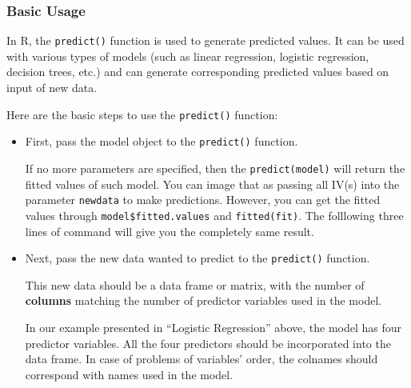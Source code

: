 \documentclass[
]{ctexart}
\newenvironment{Shaded}{\begin{snugshade}}{\end{snugshade}}
\newcommand{\FunctionTok}[1]{\textcolor[rgb]{0.13,0.29,0.53}{\textbf{#1}}}
\newcommand{\NormalTok}[1]{#1}
\newcommand{\SpecialCharTok}[1]{\textcolor[rgb]{0.81,0.36,0.00}{\textbf{#1}}}
\begin{document}
\hypertarget{basic-usage}{%
\subsubsection{Basic Usage}\label{basic-usage}}

In R, the \texttt{predict()} function is used to generate predicted
values. It can be used with various types of models (such as linear
regression, logistic regression, decision trees, etc.) and can generate
corresponding predicted values based on input of new data.

Here are the basic steps to use the \texttt{predict()} function:

\begin{itemize}
\item
  First, pass the model object to the \texttt{predict()} function.

  If no more parameters are specified, then the \texttt{predict(model)}
  will return the fitted values of such model. You can image that as
  passing all IV(s) into the parameter \texttt{newdata} to make
  predictions. However, you can get the fitted values through
  \texttt{model\$fitted.values} and \texttt{fitted(fit)}. The folllowing
  three lines of command will give you the completely same result.
\end{itemize}

\begin{Shaded}
\end{Shaded}

\begin{itemize}
\item
  Next, pass the new data wanted to predict to the \texttt{predict()}
  function.

  This new data should be a data frame or matrix, with the number of
  \textbf{columns} matching the number of predictor variables used in
  the model.

  In our example presented in ``Logistic Regression'' above, the model
  has four predictor variables. All the four predictors should be
  incorporated into the data frame. In case of problems of variables'
  order, the colnames should correspond with names used in the model.
\end{itemize}
\end{document}
